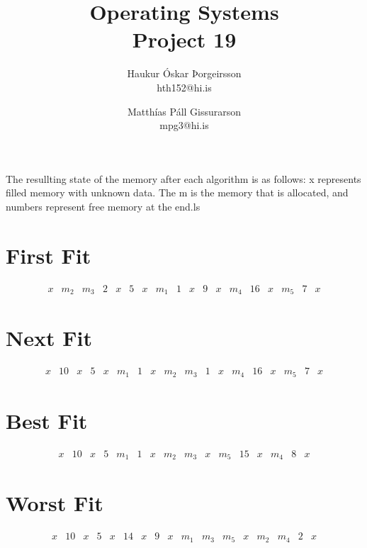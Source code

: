 \documentclass[a4]{article}
\title{Operating Systems\\
Project 19}
\author{           
    Haukur Óskar Þorgeirsson\\
    hth152@hi.is \and
    Matthías Páll Gissurarson\\
    mpg3@hi.is
}
\begin{document}
\maketitle

The resullting state of the memory after each algorithm is as follows:
x represents filled memory with unknown data. The m is the memory that is allocated, and numbers represent free memory at the end.ls

\section{First Fit}
$$
\begin{array}{|l|l|l|l|l|l|l|l|l|l|l|l|l|l|l|l|l|l|}
x & m_2 & m_3 & 2 & x & 5 & x & m_1 & 1 & x & 9 & x & m_4 & 16 & x & m_5 & 7 & x 
\end{array}
$$
\section{Next Fit}

$$
\begin{array}{|l|l|l|l|l|l|l|l|l|l|l|l|l|l|l|l|l|l|}
x & 10 & x & 5 & x & m_1 & 1 & x & m_2 & m_3 & 1 & x & m_4 & 16 & x & m_5 & 7 & x 
\end{array}
$$

\section{Best Fit}

$$
\begin{array}{|l|l|l|l|l|l|l|l|l|l|l|l|l|l|l|l|}
x & 10 & x & 5 & m_1 & 1 & x & m_2 & m_3 & x & m_5 & 15 & x & m_4 & 8 & x
\end{array}
$$

\section{Worst Fit}
$$
\begin{array}{|l|l|l|l|l|l|l|l|l|l|l|l|l|l|l|l|l|}
x & 10 & x & 5 & x & 14 & x & 9 & x & m_1 & m_3 & m_5 & x & m_2 & m_4 & 2 & x 
\end{array}
$$
\end{document}

